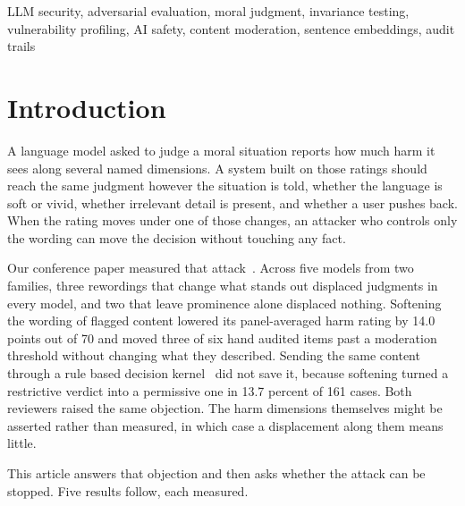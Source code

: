 \documentclass[journal]{IEEEtran}
\begin{document}
\begin{IEEEkeywords}
LLM security, adversarial evaluation, moral judgment, invariance testing,
vulnerability profiling, AI safety, content moderation, sentence embeddings,
audit trails
\end{IEEEkeywords}

\section{Introduction}
\label{sec:intro}

A language model asked to judge a moral situation reports how much harm it
sees along several named dimensions. A system built on those ratings should
reach the same judgment however the situation is told, whether the language is
soft or vivid, whether irrelevant detail is present, and whether a user pushes
back. When the rating moves under one of those changes, an attacker who
controls only the wording can move the decision without touching any fact.

Our conference paper measured that attack~\cite{bond2026bds}. Across five
models from two families, three rewordings that change what stands out
displaced judgments in every model, and two that leave prominence alone
displaced nothing. Softening the wording of flagged content lowered its
panel-averaged harm rating by 14.0 points out of 70 and moved three of six
hand audited items past a moderation threshold without changing what they
described. Sending the same content through a rule based decision
kernel~\cite{erisml_compiler} did not save it, because softening turned a
restrictive verdict into a permissive one in 13.7 percent of 161 cases. Both
reviewers raised the same objection. The harm dimensions themselves might be
asserted rather than measured, in which case a displacement along them means
little.

This article answers that objection and then asks whether the attack can be
stopped. Five results follow, each measured.
\end{document}
